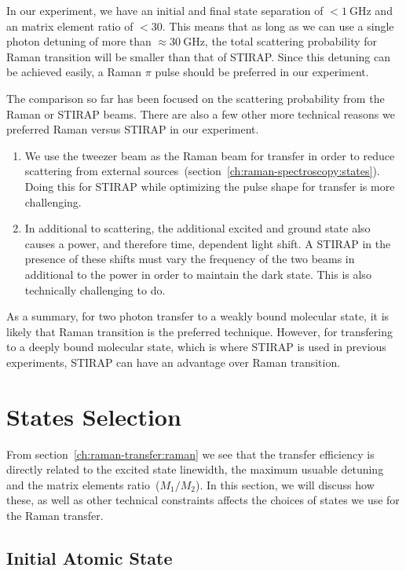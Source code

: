 In our experiment, we have an initial and final state separation of $< 1~\mathrm{GHz}$
and an matrix element ratio of $< 30$.
This means that as long as we can use a single photon detuning of more than
$\approx 30~\mathrm{GHz}$, the total scattering probability for Raman transition
will be smaller than that of STIRAP.
Since this detuning can be achieved easily,
a Raman $\pi$ pulse should be preferred in our experiment.

The comparison so far has been focused on the scattering probability from the Raman or STIRAP
beams. There are also a few other more technical reasons we preferred Raman versus STIRAP
in our experiment.

\begin{enumerate}
\item We use the tweezer beam as the Raman beam for transfer in order to reduce scattering
  from external sources~(section~\ref{ch:raman-spectroscopy:states}).
  Doing this for STIRAP while optimizing the pulse shape for transfer is more challenging.
\item In additional to scattering, the additional excited and ground state
  also causes a power, and therefore time, dependent light shift.
  A STIRAP in the presence of these shifts must vary the frequency of the two beams
  in additional to the power in order to maintain the dark state.
  This is also technically challenging to do.
\end{enumerate}

As a summary, for two photon transfer to a weakly bound molecular state,
it is likely that Raman transition is the preferred technique.
However, for transfering to a deeply bound molecular state,
which is where STIRAP is used in previous experiments,
STIRAP can have an advantage over Raman transition.

\section{States Selection}
\label{ch:raman-transfer:state-selction}

From section~\ref{ch:raman-transfer:raman} we see that the transfer efficiency
is directly related to the excited state linewidth, the maximum usuable detuning
and the matrix elements ratio~($M_1/M_2$).
In this section, we will discuss how these, as well as other technical constraints
affects the choices of states we use for the Raman transfer.

\subsection{Initial Atomic State}
\label{ch:raman-transfer:state-selction:init}

